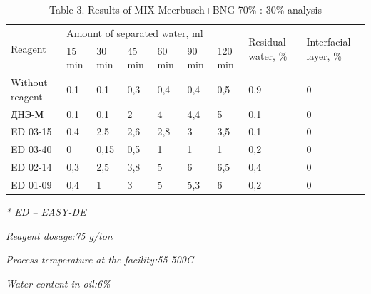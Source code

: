 \begin{table}[H]
\caption*{Table-3. Results of MIX Meerbusch+BNG 70\% : 30\% analysis}
\centering
\begin{tabular}{|l|llllll|p{}|p{}|}
\hline
\multirow{2}{*}{Reagent} & \multicolumn{6}{l|}{Amount of separated water, ml} & \multirow{2}{=}{Residual water, \%} & \multirow{2}{=}{Interfacial layer, \%} \\ \cline{2-7}
 & \multicolumn{1}{l|}{15 min} & \multicolumn{1}{l|}{30 min} & \multicolumn{1}{l|}{45 min} & \multicolumn{1}{l|}{60 min} & \multicolumn{1}{l|}{90 min} & 120 min & & \\ \hline
Without reagent & \multicolumn{1}{l|}{0,1} & \multicolumn{1}{l|}{0,1} & \multicolumn{1}{l|}{0,3} & \multicolumn{1}{l|}{0,4} & \multicolumn{1}{l|}{0,4} & 0,5 & 0,9 & 0 \\ \hline
ДНЭ-М & \multicolumn{1}{l|}{0,1} & \multicolumn{1}{l|}{0,1} & \multicolumn{1}{l|}{2} & \multicolumn{1}{l|}{4} & \multicolumn{1}{l|}{4,4} & 5 & 0,1 & 0 \\ \hline
ED 03-15 & \multicolumn{1}{l|}{0,4} & \multicolumn{1}{l|}{2,5} & \multicolumn{1}{l|}{2,6} & \multicolumn{1}{l|}{2,8} & \multicolumn{1}{l|}{3} & 3,5 & 0,1 & 0 \\ \hline
ED 03-40 & \multicolumn{1}{l|}{0} & \multicolumn{1}{l|}{0,15} & \multicolumn{1}{l|}{0,5} & \multicolumn{1}{l|}{1} & \multicolumn{1}{l|}{1} & 1 & 0,2 & 0 \\ \hline
ED 02-14 & \multicolumn{1}{l|}{0,3} & \multicolumn{1}{l|}{2,5} & \multicolumn{1}{l|}{3,8} & \multicolumn{1}{l|}{5} & \multicolumn{1}{l|}{6} & 6,5 & 0,4 & 0 \\ \hline
ED 01-09 & \multicolumn{1}{l|}{0,4} & \multicolumn{1}{l|}{1} & \multicolumn{1}{l|}{3} & \multicolumn{1}{l|}{5} & \multicolumn{1}{l|}{5,3} & 6 & 0,2 & 0 \\ \hline
\end{tabular}
\end{table}

\emph{* ED -- EASY-DE}

\emph{Reagent dosage:75 g/ton}

\emph{Process temperature at the facility:55-500C}

\emph{Water content in oil:6\%}

